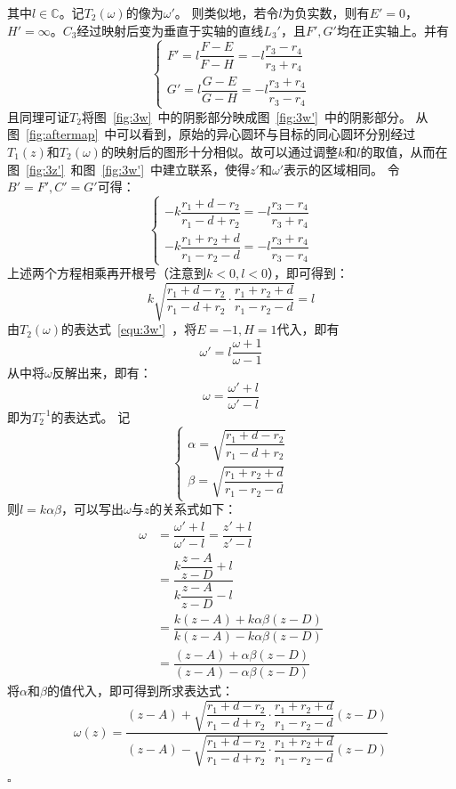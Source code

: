 \documentclass{article}
\newenvironment{SOLUTION}[1][{}]{{\noindent\heiti 解#1：}}{\hfill $\square$\par}
\begin{document}
\begin{SOLUTION}
    其中$l\in\mathbb{C}$。记$T_2(\omega)$的像为$\omega'$。
    则类似地，若令$l$为负实数，则有$E'=0$，$H'=\infty$。$C_3$经过映射后变为垂直于实轴的直线$L_3'$，且$F',G'$均在正实轴上。并有
    \begin{equation}
    \begin{cases}
    F'=l\dfrac{F-E}{F-H}=-l\dfrac{r_3-r_4}{r_3+r_4}\\[2ex]
    G'=l\dfrac{G-E}{G-H}=-l\dfrac{r_3+r_4}{r_3-r_4}
    \end{cases}
    \end{equation}
    且同理可证$T_2$将图~\ref{fig:3w}~中的阴影部分映成图~\ref{fig:3w'}~中的阴影部分。
    从图~\ref{fig:aftermap}~中可以看到，原始的异心圆环与目标的同心圆环分别经过$T_1(z)$和$T_2(\omega)$的映射后的图形十分相似。故可以通过调整$k$和$l$的取值，从而在图~\ref{fig:3z'}~和图~\ref{fig:3w'}~中建立联系，使得$z'$和$\omega'$表示的区域相同。
    令$B'=F',C'=G'$可得：
    \begin{equation}
    \begin{cases}
    -k\dfrac{r_1+d-r_2}{r_1-d+r_2}=-l\dfrac{r_3-r_4}{r_3+r_4}\\[2ex]
    -k\dfrac{r_1+r_2+d}{r_1-r_2-d}=-l\dfrac{r_3+r_4}{r_3-r_4}
    \end{cases}
    \end{equation}
    上述两个方程相乘再开根号（注意到$k<0,l<0$），即可得到：
    \begin{equation}
        k\sqrt{\dfrac{r_1+d-r_2}{r_1-d+r_2}\cdot\dfrac{r_1+r_2+d}{r_1-r_2-d}}=l
    \end{equation}
    由$T_2(\omega)$的表达式~\eqref{equ:3w'}~，将$E=-1,H=1$代入，即有
    $$
    \omega'=l\dfrac{\omega+1}{\omega-1}
    $$
    从中将$\omega$反解出来，即有：
    \begin{equation}
        \omega = \dfrac{\omega'+l}{\omega'-l}
    \end{equation}
    即为$T^{-1}_2$的表达式。
    记$$\begin{cases}
        \alpha = \sqrt{\dfrac{r_1+d-r_2}{r_1-d+r_2}}\\[2ex]
        \beta = \sqrt{\dfrac{r_1+r_2+d}{r_1-r_2-d}}
    \end{cases}$$
    则$l=k\alpha\beta$，可以写出$\omega$与$z$的关系式如下：
    \begin{equation}
        \begin{split}
        \omega &= \dfrac{\omega'+l}{\omega'-l}=\dfrac{z'+l}{z'-l}\\
        &= \dfrac{k\dfrac{z-A}{z-D}+l}{k\dfrac{z-A}{z-D}-l}\\&=\dfrac{k(z-A)+k\alpha\beta(z-D)}{k(z-A)-k\alpha \beta(z-D)}\\
        &=\dfrac{(z-A)+\alpha\beta(z-D)}{(z-A)-\alpha\beta(z-D)}
        \end{split}
    \end{equation}
    将$\alpha$和$\beta$的值代入，即可得到所求表达式：
    \begin{equation}
        \omega(z)=\dfrac{(z-A)+\sqrt{\dfrac{r_1+d-r_2}{r_1-d+r_2}\cdot\dfrac{r_1+r_2+d}{r_1-r_2-d}}(z-D)}{(z-A)-\sqrt{\dfrac{r_1+d-r_2}{r_1-d+r_2}\cdot\dfrac{r_1+r_2+d}{r_1-r_2-d}}(z-D)}
        \label{equ:3final}
    \end{equation}


\end{SOLUTION}
\end{document}
